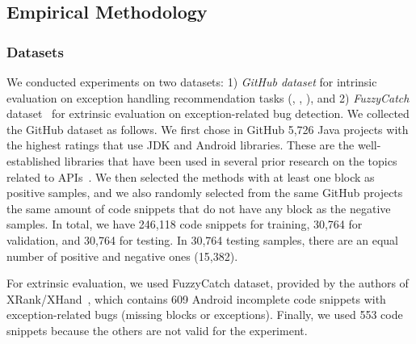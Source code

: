 \vspace{-6pt}
\subsection{Empirical Methodology}

\subsubsection{Datasets}


We conducted experiments on two datasets: 1) {\em GitHub dataset}
for intrinsic evaluation on exception handling recommendation tasks
({\xblock}, {\xstate}, {\xtype}), and 2) {\em FuzzyCatch}
dataset~\cite{xrank-fse20} for extrinsic evaluation on
exception-related bug detection.
%
%
We collected the GitHub dataset as follows. We first chose in GitHub
5,726 Java projects with the highest ratings that use
JDK and Android libraries.
These are the well-established libraries that have been used in
several prior research on the topics related to
APIs~\cite{icse18,liveapi14}.
%
We then selected the methods with at least one  block
as positive samples, and we also randomly selected from the same
GitHub projects the same amount of code snippets that do not have any
 block as the negative samples. In total, we have 246,118
code snippets for training, 30,764 for validation, and 30,764 for
testing. In 30,764 testing samples, there are an equal number of
positive and negative ones (15,382).




For extrinsic evaluation, we used FuzzyCatch dataset, provided by the
authors of XRank/XHand~\cite{xrank-fse20}, which contains 609 Android
incomplete code snippets with exception-related bugs (missing
 blocks or exceptions). Finally, we used 553 code snippets
because the others are not valid for the experiment.

